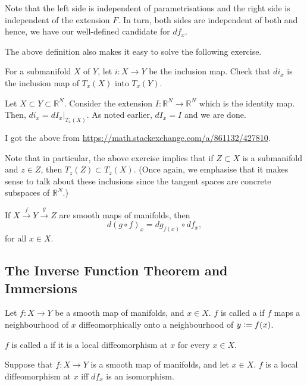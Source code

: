 Note that the left side is independent of parametrisations and the right side is independent of the extension $F$. In turn, both sides are independent of both and hence, we have our well-defined candidate for $df_{x}$. 

The above definition also makes it easy to solve the following exercise. 

\begin{exe}
	For a submanifold $X$ of $Y$, let $i : X \to Y$ be the inclusion map. Check that $di_{x}$ is the inclusion map of $T_{x}(X)$ into $T_{x}(Y)$.
\end{exe}
\begin{soln} 
	Let $X \subset Y \subset \mathbb{R}^{N}$. Consider the extension $I : \mathbb{R}^{N} \to \mathbb{R}^{N}$ which is the identity map. Then, $di_{x} = dI_{x}|_{T_{x}(X)}$. As noted earlier, $dI_{x} = I$ and we are done.
\end{soln}
I got the above from \url{https://math.stackexchange.com/a/861132/427810}.

Note that in particular, the above exercise implies that if $Z \subset X$ is a submanifold and $z \in Z$, then $T_{z}(Z) \subset T_{z}(X)$. (Once again, we emphasise that it makes sense to talk about these inclusions since the tangent spaces are concrete subspaces of $\mathbb{R}^{N}$.)

\begin{thm}
	If $X \xrightarrow{f} Y \xrightarrow{g} Z$ are smooth maps of manifolds, then
	\begin{equation*} 
		d(g \circ f)_{x} = dg_{f(x)} \circ df_{x},
	\end{equation*}
	for all $x \in X$.
\end{thm}

\subsection{The Inverse Function Theorem and Immersions}

\begin{defn}
	Let $f : X \to Y$ be a smooth map of manifolds, and $x \in X$. $f$ is called a  if $f$ maps a neighbourhood of $x$ diffeomorphically onto a neighbourhood of $y \vcentcolon= f(x)$.

	$f$ is called a  if it is a local diffeomorphism at $x$ for every $x \in X$.
\end{defn}

\begin{thm}
	Suppose that $f : X \to Y$ is a smooth map of manifolds, and let $x \in X$. \newline
	$f$ is a local diffeomorphism at $x$ iff $df_{x}$ is an isomorphism.
\end{thm}

